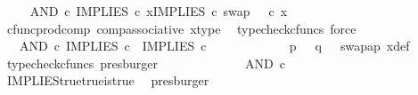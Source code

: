\begin{isabellebody}
\ \isamarkupfalse%
\ {\isachardoublequoteopen}{\isachardot}{\kern0pt}{\isachardot}{\kern0pt}{\isachardot}{\kern0pt}\ {\isacharequal}{\kern0pt}\ AND\ {\isasymcirc}\isactrlsub c\ {\isasymlangle}IMPLIES\ {\isasymcirc}\isactrlsub c\ x{\isacharcomma}{\kern0pt}IMPLIES\ {\isasymcirc}\isactrlsub c\ swap\ {\isasymOmega}\ {\isasymOmega}\ {\isasymcirc}\isactrlsub c\ x{\isasymrangle}{\isachardoublequoteclose}\isanewline
\ \ \ \ \ \ \ \ \ \ \isamarkupfalse%
\ cfunc{\isacharunderscore}{\kern0pt}prod{\isacharunderscore}{\kern0pt}comp\ comp{\isacharunderscore}{\kern0pt}associative{}\ x{\isacharunderscore}{\kern0pt}type\ \isamarkupfalse%
\ {\isacharparenleft}{\kern0pt}typecheck{\isacharunderscore}{\kern0pt}cfuncs{\isacharcomma}{\kern0pt}\ force{\isacharparenright}{\kern0pt}\isanewline
\ \ \ \ \ \ \ \ \isamarkupfalse%
\ \isamarkupfalse%
\ {\isachardoublequoteopen}{\isachardot}{\kern0pt}{\isachardot}{\kern0pt}{\isachardot}{\kern0pt}\ {\isacharequal}{\kern0pt}\ AND\ {\isasymcirc}\isactrlsub c\ {\isasymlangle}IMPLIES\ {\isasymcirc}\isactrlsub c\ {\isasymlangle}{\isasymt}{\isacharcomma}{\kern0pt}{\isasymt}{\isasymrangle}{\isacharcomma}{\kern0pt}\ IMPLIES\ {\isasymcirc}\isactrlsub c\ {\isasymlangle}{\isasymt}{\isacharcomma}{\kern0pt}{\isasymt}{\isasymrangle}{\isasymrangle}{\isachardoublequoteclose}\isanewline
\ \ \ \ \ \ \ \ \ \ \isamarkupfalse%
\ {\isacartoucheopen}p\ {\isacharequal}{\kern0pt}\ {\isasymt}{\isacartoucheclose}\ {\isacartoucheopen}q\ {\isacharequal}{\kern0pt}\ {\isasymt}{\isacartoucheclose}\ swap{\isacharunderscore}{\kern0pt}ap\ x{\isacharunderscore}{\kern0pt}def\ \isamarkupfalse%
\ {\isacharparenleft}{\kern0pt}typecheck{\isacharunderscore}{\kern0pt}cfuncs{\isacharcomma}{\kern0pt}\ presburger{\isacharparenright}{\kern0pt}\isanewline
\ \ \ \ \ \ \ \ \isamarkupfalse%
\ \isamarkupfalse%
\ {\isachardoublequoteopen}{\isachardot}{\kern0pt}{\isachardot}{\kern0pt}{\isachardot}{\kern0pt}\ {\isacharequal}{\kern0pt}\ AND\ {\isasymcirc}\isactrlsub c\ {\isasymlangle}{\isasymt}{\isacharcomma}{\kern0pt}\ {\isasymt}{\isasymrangle}{\isachardoublequoteclose}\isanewline
\ \ \ \ \ \ \ \ \ \ \isamarkupfalse%
\ IMPLIES{\isacharunderscore}{\kern0pt}true{\isacharunderscore}{\kern0pt}true{\isacharunderscore}{\kern0pt}is{\isacharunderscore}{\kern0pt}true\ \isamarkupfalse%
\ presburger\isanewline
\ \ \ \ \ \ \ \ \isamarkupfalse%
\ \isamarkupfalse%
\ {\isachardoublequoteopen}{\isachardot}{\kern0pt}{\isachardot}{\kern0pt}{\isachardot}{\kern0pt}\ {\isacharequal}{\kern0pt}\ {\isasymt}{\isachardoublequoteclose}\isanewline

\end{isabellebody}

